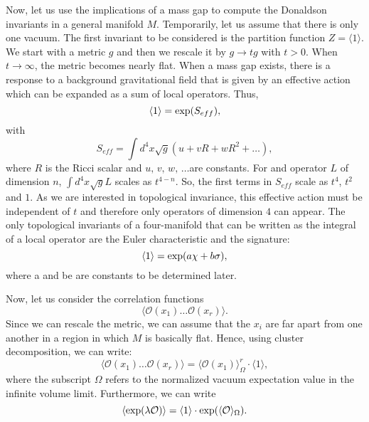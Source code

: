 \documentclass[12pt, onecolumn]{article}
\begin{document}
Now, let us use the implications of a mass gap to compute the Donaldson invariants in a general manifold $M$. Temporarily, let us assume that there is only one vacuum. The first invariant to be considered is the partition function $Z=\langle 1 \rangle$. We start with a metric $g$ and then we rescale it by $g\rightarrow tg$ with $t>0$. When $t\rightarrow \infty$, the metric becomes nearly flat. When a mass gap exists, there is a response to a background gravitational field that is given by an effective action which can be expanded as a sum of local operators. Thus, 
\begin{equation}
\langle 1 \rangle = {\rm exp}(S_{eff}),
\end{equation} with 
\begin{equation}
S_{eff} = \int d^4x \sqrt{g}(u+v R+wR^2+\ldots),
\end{equation}
where $R$ is the Ricci scalar and $u,\,v,\,w,\,\ldots$are constants.  For and operator $L$ of dimension $n$, $\int d^4x \sqrt{g} L$ scales as $t^{4-n}$. So, the first  terms in $S_{eff}$ scale as $t^4$, $t^2$ and $1$. As we are interested in topological invariance, this effective action must be independent of $t$ and therefore only operators of dimension $4$ can appear. The only topological invariants of a four-manifold that can be written as the integral of a local operator are the Euler characteristic and the signature:
\begin{equation}
\langle 1 \rangle = {\rm exp}(a \chi + b \sigma),
\end{equation} where a and be are constants to be determined later. 

Now, let us consider the correlation functions
\begin{equation}
\langle \mathcal{O}(x_1)\ldots \mathcal{O}(x_r) \rangle. 
\end{equation} Since we can rescale the metric, we can assume that the $x_i$ are far apart from one another in a region in which $M$ is basically flat. Hence, using cluster decomposition, we can write:
\begin{equation}
\langle \mathcal{O}(x_1)\ldots \mathcal{O}(x_r) \rangle = \langle \mathcal{O}(x_1) \rangle^r_\Omega \cdot \langle 1 \rangle,
\end{equation} where the subscript $\Omega$ refers to the normalized vacuum expectation value in the infinite volume limit. Furthermore, we can write
\begin{equation}
\langle {\rm exp}(\lambda \mathcal{O}) \rangle =  \langle 1 \rangle \cdot {\rm exp}( \langle \mathcal{O} \rangle_\Omega). \label{O-vev}
\end{equation}
\end{document}
